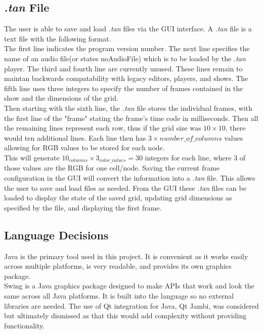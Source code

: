 \documentclass[12pt]{article}
\begin{document}
  	\subsection{\textit{.tan} File}
	  	The user is able to save and load \textit{.tan} files via the GUI interface. A \textit{.tan} file is a text file with the following format.
      \\
      The first line indicates the program version number. The next line specifies the name of an audio file(or states noAudioFile) which is to be loaded by the \textit{.tan} player. The third and fourth line are currently unused. These lines remain to maintan backwards compatability with legacy editors, players, and shows. The fifth line uses three integers to specify the number of frames contained in the show and the dimensions of the grid. 
      \\
      Then starting with the sixth line, the \textit{.tan} file stores the individual frames, with the first line of the "frame" stating the frame's time code in milliseconds. Then all the remaining lines represent each row, thus if the grid size was $10 \times 10$, there would ten additional lines. Each line then has $3 \times number\_of\_columns$ values allowing for RGB values to be stored for each node.
      \\
      This will generate $10_{columns} \times 3_{color\_values}=30$ integers for each line, where 3 of those values are the RGB for one cell/node. Saving the current frame configuration in the GUI will convert the information into a \textit{.tan} file. This allows the user to save and load files as needed. From the GUI these \textit{.tan} files can be loaded to display the state of the saved grid, updating grid dimensions as specified by the file, and displaying the first frame.
  	
  	\subsection{Language Decisions}
    	Java is the primary tool used in this project. It is convenient as it works easily across multiple platforms, is very readable, and provides its own graphics package. 
      \\
      Swing is a Java graphics package designed to make APIs that work and look the same across all Java platforms. It is built into the language so no external libraries are needed. The use of Qt integration for Java, Qt Jambi, was considered but ultimately dismissed as that this would add complexity without providing functionality. 
      
\end{document}
